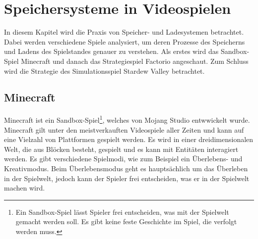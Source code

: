\chapter{Speichersysteme in Videospielen}\label{ch:videospiele}
In diesem Kapitel wird die Praxis von Speicher- und Ladesystemen betrachtet. Dabei werden verschiedene Spiele analysiert, um deren Prozesse des Speicherns und Ladens des Spielstandes genauer zu verstehen. Als erstes wird das Sandbox-Spiel Minecraft und danach das Strategiespiel Factorio angeschaut. Zum Schluss wird die Strategie des Simulationsspiel Stardew Valley betrachtet.


\section{Minecraft}
Minecraft ist ein Sandbox-Spiel\footnote{Ein Sandbox-Spiel lässt Spieler frei entscheiden, was mit der Spielwelt gemacht werden soll. Es gibt keine feste Geschichte im Spiel, die verfolgt werden muss.\cite{ocio2009multi}}, welches von Mojang Studio entwwickelt wurde. Minecraft gilt unter den meistverkauften Videospiele aller Zeiten und kann auf eine Vielzahl von Plattformen gespielt werden.\cite{ignBestSellingVideo} Es wird in einer dreidimensionalen Welt, die aus Blöcken besteht, gespielt und es kann mit Entitäten interagiert werden. Es gibt verschiedene Spielmodi, wie zum Beispiel ein Überlebens- und Kreativmodus. Beim Überlebensmodus geht es hauptsächlich um das Überleben in der Spielwelt, jedoch kann der Spieler frei entscheiden, was er in der Spielwelt machen wird.\cite{minecraftWikiHome}

